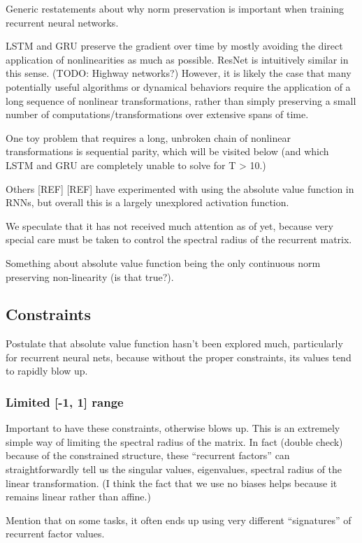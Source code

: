 \documentclass{article}
\begin{document}
Generic restatements about why norm preservation is important when training recurrent neural networks.

LSTM and GRU preserve the gradient over time by mostly avoiding the direct application of nonlinearities as much as possible. ResNet is intuitively similar in this sense. (TODO: Highway networks?) However, it is likely the case that many potentially useful algorithms or dynamical behaviors require the application of a long sequence of nonlinear transformations, rather than simply preserving a small number of computations/transformations over extensive spans of time.

One toy problem that requires a long, unbroken chain of nonlinear transformations is sequential parity, which will be visited below (and which LSTM and GRU are completely unable to solve for T > 10.)

Others [REF] [REF] have experimented with using the absolute value function in RNNs, but overall this is a largely unexplored activation function.
 
We speculate that it has not received much attention as of yet, because very special care must be taken to control the spectral radius of the recurrent matrix.

Something about absolute value function being the only continuous norm preserving non-linearity (is that true?).

\subsection{Constraints}

Postulate that absolute value function hasn’t been explored much, particularly for recurrent neural nets, because without the proper constraints, its values tend to rapidly blow up.

\subsubsection{Limited [-1, 1] range}
Important to have these constraints, otherwise blows up.
This is an extremely simple way of limiting the spectral radius of the matrix.
In fact (double check) because of the constrained structure, these “recurrent factors” can straightforwardly tell us the singular values, eigenvalues, spectral radius of the linear transformation. (I think the fact that we use no biases helps because it remains linear rather than affine.)

Mention that on some tasks, it often ends up using very different “signatures” of recurrent factor values.
\end{document}
